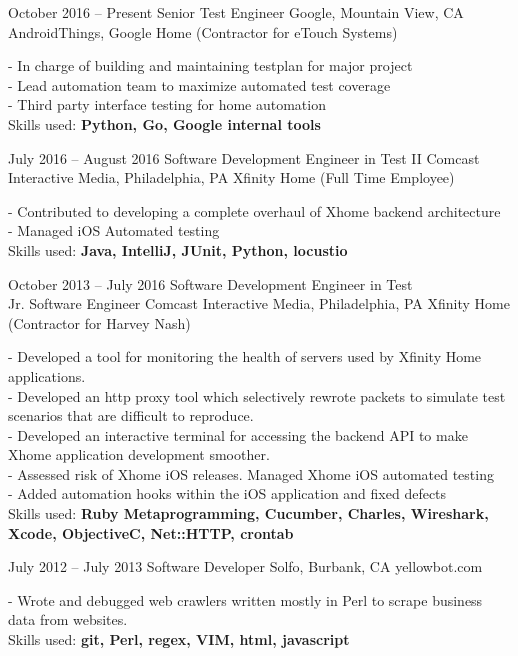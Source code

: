 \documentclass[oldfontcommands]{tccv}
\begin{document}
\begin{eventlist}
\item{October 2016 -- Present}
     {Senior Test Engineer}
     {Google, Mountain View, CA}
     {AndroidThings, Google Home (Contractor for eTouch Systems)}

- In charge of building and maintaining testplan for major project \\
- Lead automation team to maximize automated test coverage \\
- Third party interface testing for home automation \\
Skills used: \textbf{Python, Go, Google internal tools}

\item{July 2016 -- August 2016}
     {Software Development Engineer in Test II}
     {Comcast Interactive Media, Philadelphia, PA}
     {Xfinity Home (Full Time Employee)}

- Contributed to developing a complete overhaul of Xhome backend architecture \\
- Managed iOS Automated testing \\
Skills used: \textbf{Java, IntelliJ, JUnit, Python, locustio}

\item{October 2013 -- July 2016}
     {Software Development Engineer in Test \\Jr. Software Engineer}
     {Comcast Interactive Media, Philadelphia, PA}
     {Xfinity Home (Contractor for Harvey Nash)}

- Developed a tool for monitoring the health of servers used by Xfinity Home applications. \\
- Developed an http proxy tool which selectively rewrote packets to simulate test scenarios that are difficult to reproduce. \\
- Developed an interactive terminal for accessing the backend API to make Xhome application development smoother. \\
- Assessed risk of Xhome iOS releases. Managed Xhome iOS automated testing \\
- Added automation hooks within the iOS application and fixed defects \\
Skills used: \textbf{Ruby Metaprogramming, Cucumber, Charles, Wireshark, Xcode, ObjectiveC,  Net::HTTP, crontab}

\item{July 2012 -- July 2013}
     {Software Developer}
     {Solfo, Burbank, CA}
     {yellowbot.com}

- Wrote and debugged web crawlers written mostly in Perl to scrape business data from websites. \\
Skills used: \textbf{git, Perl, regex, VIM, html, javascript}

\end{eventlist}
\end{document}
